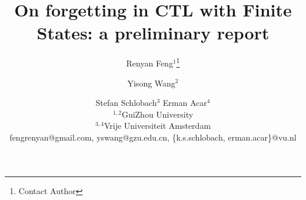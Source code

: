 \documentclass{article}
\title{On forgetting in CTL with Finite States: a preliminary report}
\author{
Renyan Feng$^1$\footnote{Contact Author}\and
Yisong Wang$^2$\and
Stefan Schlobach$^{3}$\And
Erman Acar$^4$\\
\affiliations
$^{1,2}$GuiZhou University\\
$^{3,4}$Vrije Universiteit Amsterdam\\
\emails
fengrenyan@gmail.com,
yswang@gzu.edu.cn,
\{k.s.schlobach, erman.acar\}@vu.nl
}
\begin{document}
\newcommand{\tuple}[1]{{\langle{#1}\rangle}}
\newcommand{\Mod}{\textit{Mod}}
\newcommand\ie{{\it i.e. }}
\newcommand\eg{{\it e.g.}}
\newtheorem{definition}{Definition}
\newtheorem{examp}{Example}
\newenvironment{example}{\begin{examp}\rm}{\end{examp}}
\newtheorem{lemma}{Lemma}
\newtheorem{proposition}{Proposition}
\newtheorem{theorem}{Theorem}
\newtheorem{corollary}[theorem]{Corollary}
\newenvironment{proof}{{\bf Proof:}}{\hfill\rule{2mm}{2mm}\\ }
\newcommand{\rto}{\rightarrow}
\newcommand{\lto}{\leftarrow}
\newcommand{\lrto}{\leftrightarrow}
\newcommand{\Rto}{\Rightarrow}
\newcommand{\Lto}{\Leftarrow}
\newcommand{\LRto}{\Leftrightarrow}
\newcommand{\Var}{\textit{Var}}
\newcommand{\Forget}{\textit{Forget}}
\newcommand{\KForget}{\textit{KForget}}
\newcommand{\TForget}{\textit{TForget}}
\newcommand{\Fst}{\textit{Fst}}
\newcommand{\dep}{\textit{dep}}
\newcommand{\term}{\textit{term}}
\newcommand{\literal}{\textit{literal}}

\newcommand{\Atom}{\mathcal{A}}
\newcommand{\SFive}{\textbf{S5}}
\newcommand{\MPK}{\textsc{k}}
\newcommand{\MPB}{\textsc{b}}
\newcommand{\MPT}{\textsc{t}}
\newcommand{\MPA}{\forall}
\newcommand{\MPE}{\exists}

\newcommand{\DNF}{\textit{DNF}}
\newcommand{\CNF}{\textit{CNF}}

\newcommand{\degree}{\textit{degree}}
\newcommand{\sunfold}{\textit{sunfold}}

\newcommand{\Pos}{\textit{Pos}}
\newcommand{\Neg}{\textit{Neg}}
\newcommand\wrt{{\it w.r.t.}}
\newcommand{\Hm} {{\cal M}}
\newcommand{\Hw} {{\cal W}}
\newcommand{\Hr} {{\cal R}}
\newcommand{\Hb} {{\cal B}}
\newcommand{\Ha} {{\cal A}}

\newcommand{\Dsj}{\triangledown}

\newcommand{\wnext}{\widetilde{\bigcirc}}
\newcommand{\nex}{\bigcirc}
\newcommand{\ness}{\square}
\newcommand{\qness}{\boxminus}
\newcommand{\wqnext}{\widetilde{\circleddash}}
\newcommand{\qnext}{\circleddash}
\newcommand{\may}{\lozenge}
\newcommand{\qmay}{\blacklozenge}
\newcommand{\unt} {{\cal U}}
\newcommand{\since} {{\cal S}}
\newcommand{\SNF} {\textit{SNF$_C$}}
\newcommand{\start}{\textbf{start}}
\newcommand{\Elm}{\textit{Elm}}
\newcommand{\simp}{\textbf{simp}}
\newcommand{\nnf}{\textbf{nnf}}

\newcommand{\CTL}{\textrm{CTL}}
\newcommand{\Ind}{\textrm{Ind}}
\newcommand{\Tran}{\textrm{Tran}}
\newcommand{\Sub}{\textrm{Sub}}
\newcommand{\forget}{{\textsc{f}_\CTL}}
\newcommand{\ALL}{\textsc{a}}
\newcommand{\EXIST}{\textsc{e}}
\newcommand{\NEXT}{\textsc{x}}
\newcommand{\FUTURE}{\textsc{f}}
\newcommand{\UNTIL}{\textsc{u}}
\newcommand{\GLOBAL}{\textsc{g}}
\newcommand{\UNLESS}{\textsc{w}}
\newcommand{\Def}{\textrm{def}}
\newcommand{\IR}{\textrm{IR}}
\newcommand{\Tr}{\textrm{Tr}}
\newcommand{\dis}{\textrm{dis}}
\def\PP{\ensuremath{\textbf{PP}}}
\def\NgP{\ensuremath{\textbf{NP}}}
\def\W{\ensuremath{\textbf{W}}}
\newcommand{\Pre}{\textrm{Pre}}
\newcommand{\Post}{\textrm{Post}}
\end{document}
